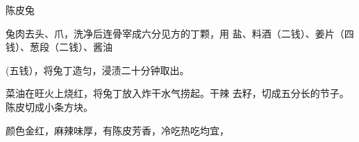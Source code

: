 \begin{recipe}{陈皮兔}

\ingredients


\cooking

\step 	兔肉去头、爪，洗净后连骨宰成六分见方的丁颗，用 盐、料酒（二钱）、姜片（四钱）、葱段（二钱）、酱油

(五钱），将兔丁造匀，浸渍二十分钟取出。

\step 	菜油在旺火上烧红，将兔丁放入炸干水气捞起。干辣 去籽，切成五分长的节子。陈皮切成小条方块。

\notes

颜色金红，麻辣味厚，有陈皮芳香，冷吃热吃均宜，

\end{recipe}

